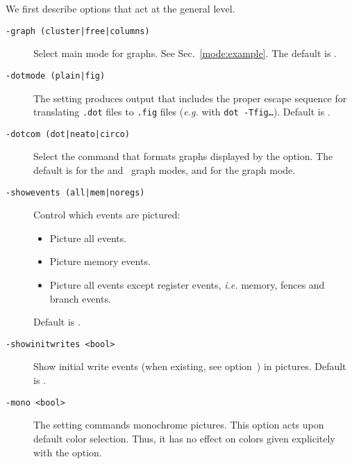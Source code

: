 We first describe options that act at the general level.
\begin{description}
\item[{\tt -graph (cluster|free|columns)}] Select main mode for graphs.
See Sec.~\ref{mode:example}. The default is .
\item[{\tt -dotmode (plain|fig)}] The setting 
produces output that includes the proper escape
sequence for translating \texttt{.dot} files
to \texttt{.fig} files (\emph{e.g.} with \texttt{dot -Tfig\ldots}).
Default is .
\item[{\tt -dotcom (dot|neato|circo)}] Select the command that formats
graphs displayed by the  option.
The default is  for the  and~ graph modes,
and  for the  graph mode.

\item[{\tt -showevents (all|mem|noregs)}] Control which events are
pictured:
\begin{itemize}
\item {} Picture all events.
\item {} Picture memory events.
\item {} Picture all events except register events,
\emph{i.e.} memory, fences and branch events.
\end{itemize}
Default is .

\item[{\tt -showinitwrites <bool>}] Show initial write events
(when existing, see option~)
in pictures. Default is .

\item[{\tt -mono <bool>}] The setting  commands monochrome
pictures. This option acts upon default color selection. Thus, it
has no effect on colors given explicitely with the
 option.


\end{description}

